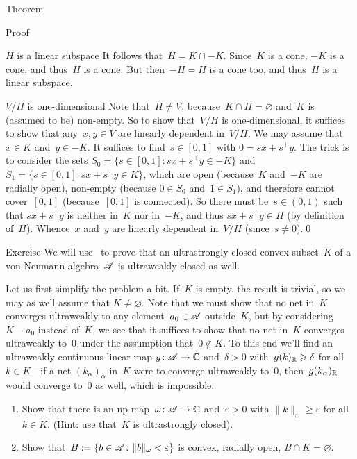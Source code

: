 \documentclass[a]{subfiles}
\begin{document}
\begin{parsec}
\begin{point}{Theorem}
\begin{point}{Proof}
\begin{point}{$H$ is a linear subspace}
It follows that~$H=\overline{K}\cap -\overline{K}$.
Since~$\overline{K}$ is a cone, $-\overline{K}$ is a cone,
and thus~$H$ is a cone.  But then~$-H=H$ is a cone too,
and thus~$H$ is a linear subspace.
\end{point}
\begin{point}{$V/H$ is one-dimensional}%
Note that~$H\neq V$, because~$K\cap H=\varnothing$
and~$K$ is (assumed to be) non-empty.
So to show that~$V/H$ is one-dimensional,
it suffices to show that
any~$x,y\in V$ 
 are linearly dependent in~$V/H$.
We may assume that~$x\in K$ and~$y\in -K$.
It suffices to find~$s\in [0,1]$ with $0=sx+s^\perp y$.
The trick is to consider the sets
 $S_0 = \{s\in [0,1]\colon sx+s^\perp y \in -K\}$
and~$S_1 = \{s\in [0,1]\colon sx+s^\perp y \in K\}$,
which are open (because~$K$ and~$-K$ are radially open),
non-empty (because $0\in S_0$ and~$1\in S_1$),
and therefore cannot cover~$[0,1]$
(because~$[0,1]$ is connected).
So there must be~$s\in (0,1)$ 
such that
$sx+s^\perp y $ 
is neither in~$K$
nor in~$-K$,
and thus $sx+s^\perp y \in H$ (by definition of~$H$).
Whence~$x$ and~$y$ are linearly dependent in~$V/H$
(since~$s\neq 0$).\qed
\end{point}
\end{point}
\end{point}
\begin{point}[ultraclosed]{Exercise}%
We will use~
to prove that 
an ultrastrongly closed convex subset~$K$ of a 
von Neumann algebra~$\mathscr{A}$
is ultraweakly closed as well.

Let us first simplify the problem a bit.
If~$K$ is empty, the result is trivial,
so we may as well assume that $K\neq \varnothing$.
Note that we must show that no net in~$K$ converges ultraweakly
to any element~$a_0\in\mathscr{A}$ outside~$K$,
but by considering~$K-a_0$ instead of~$K$,
we see that it suffices to show that
no net in~$K$ converges ultraweakly to~$0$
under the assumption that~$0\notin K$.
To this end we'll find an ultraweakly continuous linear map
$g\colon \mathscr{A}\to \mathbb{C}$ and~$\delta>0$ 
with~$g(k)_{\mathbb{R}}\geqslant \delta$ for all~$k\in K$---if
a net $(k_\alpha)_\alpha$ in~$K$ were to converge ultraweakly to~$0$,
then~$g(k_\alpha)_{\mathbb{R}}$ would converge to~$0$ as well,
which is impossible.
\begin{enumerate}
\item
	Show that 
	there is an np-map~$\omega \colon\mathscr{A}\to\mathbb{C}$
	and~$\varepsilon>0$ 
	with $\|k\|_\omega \geq \varepsilon$ for all~$k\in K$.
	(Hint: use that~$K$ is ultrastrongly closed).
\item
	Show that~$B:= \{ b\in \mathscr{A}\colon \|b\|_\omega < \varepsilon\}$
	 is convex, radially open, $B\cap K=\varnothing$.


\end{enumerate}
\end{point}
\end{parsec}
\end{document}
